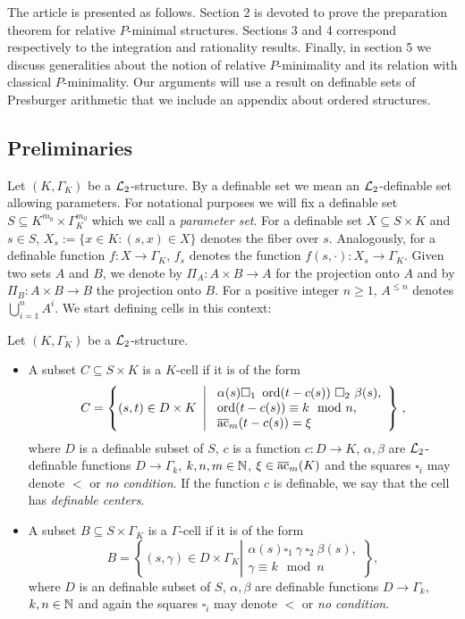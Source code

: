 The article is presented as follows. Section 2 is devoted to prove the preparation theorem for relative $P$-minimal structures. Sections 3 and 4 correspond respectively to the integration and rationality results. Finally, in section 5 we discuss generalities about the notion of relative $P$-minimality and its relation with classical $P$-minimality. Our arguments will use a result on definable sets of Presburger arithmetic that we include an appendix about ordered structures. 

\subsection{Preliminaries}

Let $(K,\Gamma_K)$ be a ${\mathcal L}_2$-structure. By a definable set we mean an $\mathcal{L}_2$-definable set allowing parameters. For notational purposes we will fix a definable set $S \subseteq K^{m_0} \times \Gamma_K^{m_0}$ which we call a \emph{parameter set}. For a definable set $X\subseteq S\times K$ and $s\in S$, $X_s:=\{x\in K: (s,x)\in X\}$ denotes the fiber over $s$. Analogously, for a definable function $f:X\rightarrow \Gamma_K$, $f_s$ denotes the function $f(s,\cdot):X_s\rightarrow \Gamma_K$. Given two sets $A$ and $B$, we denote by $\Pi_{A}:A\times B\to A$ for the projection onto $A$ and by $\Pi_B:A\times B\to B$ the projection onto $B$. For a positive integer $n\geq 1$, $A^{\leq n}$ denotes $\bigcup_{i=1}^n A^i$. We start defining cells in this context: 

\begin{defn}[Cells]\label{def:cell} Let $(K,\Gamma_K)$ be a ${\mathcal L}_2$-structure.  
\begin{itemize}[leftmargin=*]
\item A subset $C\subseteq S\times K$ is a $K$-cell if it is of the form 
\[C = \left\{(s,t) \in D\times K \ \left| \ \begin{array}{l} \alpha(s) \square_1 \ \operatorname{ord}(t-c(s)) \ \square_2 \ \beta(s),\\ \operatorname{ord}(t-c(s)) \equiv k\mod n,\\ {\overline{\rm ac}}_{m}(t-c(s)) = \xi \end{array} \right\}\right.,\]
where $D$ is a definable subset of $S$, $c$ is a function $c:D\to K$, $\alpha, \beta$ are $\mathcal{L}_2$-definable functions $D\to\Gamma_k$, $k, n, m \in {\mathbb N}$, $\xi \in {\overline{\rm ac}}_{m}(K)$ and the squares $\square_i$ may denote $<$ or \emph{no condition}. If the function $c$ is definable, we say that the cell has \emph{definable centers}.  
\item A subset $B\subseteq S\times \Gamma_K$ is a $\Gamma$-cell if it is of the form
\[B= \left\{(s,\gamma)\in D\times \Gamma_K \left|\begin{array}{l} \alpha(s) \square_1 \ \gamma \ \square_2 \ \beta(s), \\
\gamma \equiv k\mod n \end{array}\right\}\right.,\]
where $D$ is an definable subset of $S$, $\alpha, \beta$ are definable functions $D\to\Gamma_k$, $k, n\in {\mathbb N}$ and again the squares $\square_i$ may denote $<$ or \emph{no condition}.  
\end{itemize}
\end{defn}

